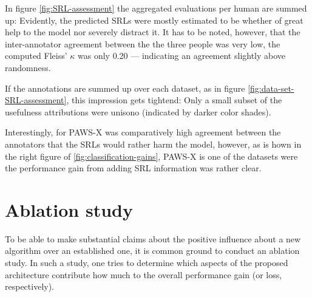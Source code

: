 {In figure \ref{fig:SRL-assessment} the aggregated evaluations per human are summed up:
Evidently, the predicted SRLs were mostly estimated to be whether of great help to the model
nor severely distract it. It has to be noted, however, that the inter-annotator agreement between
the the three people was very low, the computed Fleiss' $\kappa$ was only 0.20 --- indicating
an agreement slightly above randomness.

If the annotations are summed up over each dataset, as in figure \ref{fig:data-set-SRL-assessment}, this
impression gets tightend: Only a small subset of the usefulness attributions were unisono (indicated
by darker color shades).


Interestingly, for PAWS-X was comparatively high agreement between the annotators that the SRLs would
rather harm the model, however, as is hown in the right figure of \ref{fig:classification-gains}, PAWS-X
is one of the datasets were the performance gain from adding SRL information was rather clear.














\cite{do2018flexible}


\section{Ablation study}
\label{sec:ablation}

To be able to make substantial claims about the positive influence about a new algorithm over an
established one, it is common ground to conduct an ablation study. In such a study, one tries to
determine which aspects of the proposed architecture contribute how much to the overall performance
gain (or loss, respectively).

}

